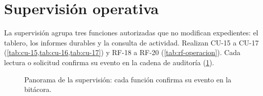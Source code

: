 
\section{Supervisión operativa}\label{sec:impl-supervision}

La supervisión agrupa tres funciones autorizadas que no modifican expedientes:
el tablero, los informes durables y la consulta de actividad. Realizan CU-15 a
CU-17 (\cref{tab:cu-15,tab:cu-16,tab:cu-17}) y RF-18 a RF-20
(\cref{tab:rf-operacion}). Cada lectura o solicitud confirma su evento en la
cadena de auditoría (\cref{fig:impl-supervision}).

\begin{figure}[!htbp]
  \centering
  
  \caption{Panorama de la supervisión: cada función confirma su evento en la bitácora.}
  \label{fig:impl-supervision}
\end{figure}







